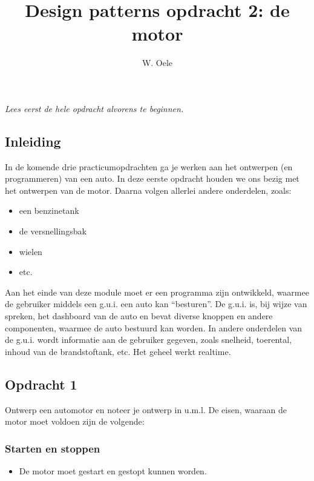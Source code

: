 \documentclass[fleqn,11pt]{article}
\title{Design patterns opdracht 2: de motor}
\author{W. Oele}
\begin{document}
\sffamily
\maketitle
\newpage
\emph{Lees eerst de hele opdracht alvorens te beginnen.}

\subsection*{Inleiding}
In de komende drie practicumopdrachten ga je werken aan het ontwerpen (en programmeren) van een auto. In deze eerste opdracht houden we ons bezig met het ontwerpen van de motor. Daarna volgen allerlei andere onderdelen, zoals:
\begin{itemize}
\item een benzinetank
\item de versnellingsbak
\item wielen
\item etc.
\end{itemize}
Aan het einde van deze module moet er een programma zijn ontwikkeld, waarmee de gebruiker middels een g.u.i. een auto kan ``besturen''. De g.u.i. is, bij wijze van spreken, het dashboard van de auto en bevat diverse knoppen en andere componenten, waarmee de auto bestuurd kan worden. In andere onderdelen van de g.u.i. wordt informatie aan de gebruiker gegeven, zoals snelheid, toerental, inhoud van de brandstoftank, etc. Het geheel werkt realtime. 
\begin{center}
\end{center}


\subsection*{Opdracht 1}
Ontwerp een automotor en noteer je ontwerp in u.m.l. De eisen, waaraan de motor moet voldoen zijn de volgende:

\subsubsection*{Starten en stoppen}
\begin{itemize}
\item De motor moet gestart en gestopt kunnen worden.
\end{itemize}
\end{document}
